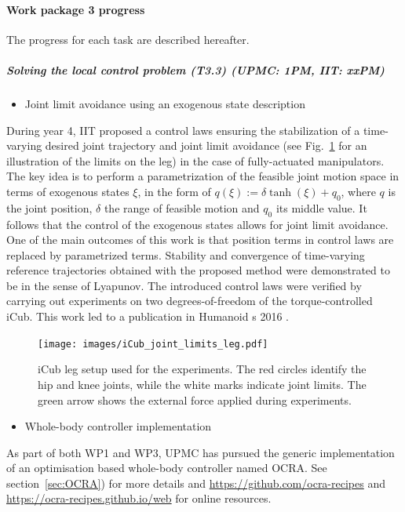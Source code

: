 

 
\paragraph{Work package 3 progress}

The progress for each task are described hereafter.

\subparagraph{Solving the local control problem (T3.3) (UPMC: 1PM, IIT: xxPM)}

\begin{itemize}
\item {Joint limit avoidance using an exogenous state description}
\end{itemize}
During year 4, IIT proposed a control laws ensuring the stabilization of a time-varying desired joint trajectory and joint limit avoidance (see Fig.~\ref{fig:icub leg limits} for an illustration of the limits on the leg) in the case of fully-actuated manipulators. The key idea is to perform a parametrization of the feasible joint motion space in terms of exogenous states $\xi$, in the form of $q(\xi) := \delta \tanh(\xi) + q_0$, where $q$ is the joint position, $\delta$ the range of feasible motion and $q_0$ its middle value. It follows that the control of the exogenous states allows for joint limit avoidance. One of the main outcomes of this work is that position terms in control laws are replaced by parametrized terms. Stability and convergence of time-varying reference trajectories obtained with the proposed method were demonstrated to be in the sense of Lyapunov. The introduced control laws were verified by carrying out experiments on two degrees-of-freedom of the torque-controlled iCub. This work led to a publication in Humanoid s 2016 \cite{charbonneau2016Humanoids}.

\begin{figure}
   \begin{center}
    \texttt{[image: images/iCub\_joint\_limits\_leg.pdf]}
    \caption{iCub leg setup used for the experiments. The red circles identify the hip and knee joints, while the white marks indicate joint limits. The green arrow shows the external force applied during experiments.}
    \label{fig:icub leg limits}
    \end{center}
\end{figure}


\begin{itemize}
\item {Whole-body controller implementation}
\end{itemize}
As part of both WP1 and WP3, UPMC has pursued the generic implementation of an optimisation based whole-body controller named OCRA. See section~\ref{sec:OCRA}) for more details and \url{https://github.com/ocra-recipes} and \url{https://ocra-recipes.github.io/web} for online resources.

